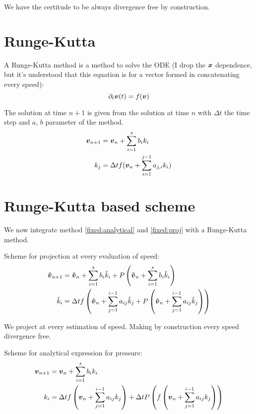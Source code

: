 We have the certitude to be always divergence free by construction.

\section{Runge-Kutta}

A Runge-Kutta method is a method to solve the ODE (I drop the ${\boldsymbol {x}}$ dependence, but it's understood that this equation is for a vector formed in concatenating every speed):
\begin{equation}
\partial_t {\boldsymbol {v}}(t)=f({\boldsymbol {v}})
\end{equation}

The solution at time $n+1$ is given from the solution at time $n$ with $\Delta t$ the time step and $a$, $b$ parameter of the method.
\begin{subequations}
\begin{align}
	{\boldsymbol {v}}_{n+1}&={\boldsymbol {v}}_{n}+\sum_{i=1}^{s}b_{i}k_{i}\\
	k_{j}&=\Delta t f({\boldsymbol {v}}_{n}+\sum_{i=1}^{j-1}a_{j,i}k_{i})
\end{align}
\end{subequations}

\section{Runge-Kutta based scheme}
\label{fixed:sect:runge-kutta}
We now integrate method \ref{fixed:analytical} and \ref{fixed:proj} with a Runge-Kutta method.

Scheme for projection at every evaluation of speed:
\begin{subequations}
\begin{align}
{\boldsymbol {\tilde{v}}}_{n+1}&={\boldsymbol {\tilde{v}}}_{n}+\sum_{i=1}^{s}b_{i}\tilde{k}_{i}+P\left({\boldsymbol {\tilde{v}}}_{n}+\sum_{i=1}^{s}b_{i}\tilde{k}_{i}\right)\\
\tilde{k}_{i}&=\Delta t f\left({\boldsymbol {\tilde{v}}}_{n}+\sum_{j=1}^{i-1}a_{ij}\tilde{k}_{j}+P\left({\boldsymbol {\tilde{v}}}_{n}+\sum_{j=1}^{i-1}a_{ij}\tilde{k}_{j}\right)\right)
\end{align}
\end{subequations}

We project at every estimation of speed. Making by construction every speed divergence free.

Scheme for analytical expression for pressure:
\begin{subequations}
\begin{align}
	{\boldsymbol {v}}_{n+1}&={\boldsymbol {v}}_{n}+\sum_{i=1}^{s}b_{i}k_{i}\\
	k_{i}&=\Delta t f\left({\boldsymbol {v}}_{n}+\sum_{j=1}^{i-1}a_{ij}k_{j}\right)+\Delta t P\left(f\left({\boldsymbol {v}}_{n}+\sum_{j=1}^{i-1}a_{ij}k_{j}\right)\right)
\end{align}
\end{subequations}

